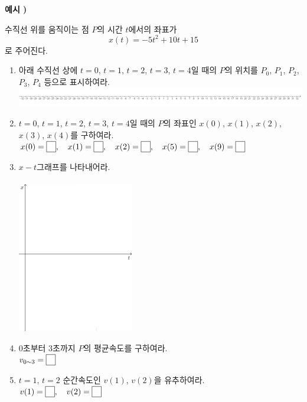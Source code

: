 \documentclass{oblivoir}
\newcounter{num}
\newcommand\exam[1]
{\bigskip\par\noindent\stepcounter{num} \textbf{예시 \thenum) #1}\par\noindent}
\newcommand\pb[1]{\ensuremath{\fbox{\phantom{#1}}}}
\begin{document}
\clearpage
%
\exam{}
수직선 위를 움직이는 점 \(P\)의 시간 \(t\)에서의 좌표가
\[x(t)=-5t^2+10t+15\]
로 주어진다.
\begin{enumerate}[label=(\(\arabic*\))]
\item
아래 수직선 상에 \(t=0\), \(t=1\), \(t=2\), \(t=3\), \(t=4\)일 때의 \(P\)의 위치를 \(P_0\), \(P_1\), \(P_2\), \(P_3\), \(P_4\) 등으로 표시하여라.\\
\includegraphics[width=1.3\textwidth]{line2}
\item
\(t=0\), \(t=1\), \(t=2\), \(t=3\), \(t=4\)일 때의 \(P\)의 좌표인 \(x(0)\), \(x(1)\), \(x(2)\), \(x(3)\), \(x(4)\)를 구하여라.\\
\(x(0)=\pb{1},\quad x(1)=\pb{1},\quad x(2)=\pb{1},\quad x(5)=\pb{1},\quad x(9)=\pb{1}\)
\item
\(x-t\)그래프를 나타내어라.\\\\
\includegraphics[width=0.4\textwidth]{xt}
\item
\(0\)초부터 \(3\)초까지 \(P\)의 평균속도를 구하여라.\\
\(v_{0\sim3}=\pb{1}\)
\item
\(t=1\), \(t=2\) 순간속도인 \(v(1)\), \(v(2)\)을 유추하여라.\\
\(v(1)=\pb{1},\quad v(2)=\pb{1}\)
\end{enumerate}

\end{document}
